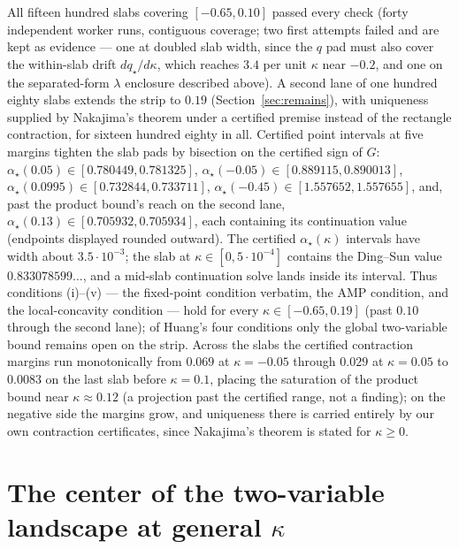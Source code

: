 \documentclass[11pt]{article}
\theoremstyle{remark}
\begin{document}
All fifteen hundred slabs covering $[-0.65,0.10]$ passed every check
(forty independent worker runs, contiguous coverage; two first
attempts failed and are kept as evidence --- one at doubled slab
width, since the $q$ pad must also cover the within-slab drift
$dq_\star/d\kappa$, which reaches $3.4$ per unit $\kappa$ near
$-0.2$, and one on the separated-form $\lambda$ enclosure described
above).  A second lane of one hundred eighty slabs extends the strip
to $0.19$ (Section~\ref{sec:remains}), with uniqueness supplied by
Nakajima's theorem under a certified premise instead of the
rectangle contraction, for sixteen hundred eighty in all.  Certified
point intervals at five margins tighten the slab pads by bisection on
the certified sign of $G$:
$\alpha_\star(0.05)\in[0.780449,0.781325]$,
$\alpha_\star(-0.05)\in[0.889115,0.890013]$,
$\alpha_\star(0.0995)\in[0.732844,0.733711]$,
$\alpha_\star(-0.45)\in[1.557652,1.557655]$, and, past the product
bound's reach on the second lane,
$\alpha_\star(0.13)\in[0.705932,0.705934]$, each containing its
continuation value (endpoints displayed rounded outward).
The certified $\alpha_\star(\kappa)$ intervals have width about
$3.5\cdot10^{-3}$; the slab at $\kappa\in[0,5\cdot10^{-4}]$ contains
the Ding--Sun value $0.833078599\ldots$, and a mid-slab continuation
solve lands inside its interval.  Thus conditions (i)--(v) --- the
fixed-point condition verbatim, the AMP condition, and the
local-concavity condition --- hold for every
$\kappa\in[-0.65,0.19]$ (past $0.10$ through the second lane); of
Huang's four conditions only the global two-variable bound remains
open on the strip.  Across the slabs the certified contraction margins run monotonically
from $0.069$ at $\kappa=-0.05$ through $0.029$ at $\kappa=0.05$ to
$0.0083$ on the last slab before $\kappa=0.1$, placing the saturation
of the product bound near $\kappa\approx0.12$ (a projection past the
certified range, not a finding); on the negative side the margins
grow, and uniqueness there is carried entirely by our own contraction
certificates, since Nakajima's theorem is stated for $\kappa\ge0$.

\section{The center of the two-variable landscape at general
$\kappa$}
\end{document}
